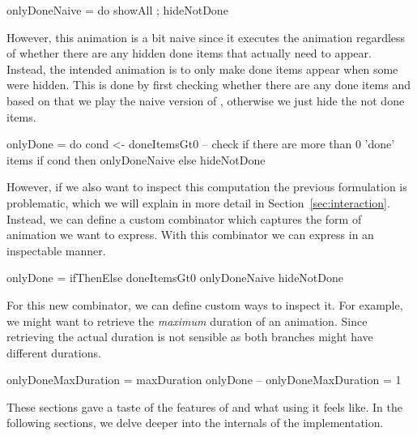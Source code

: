 \begin{spec}
onlyDoneNaive = do showAll ; hideNotDone
\end{spec}

However, this animation is a bit naive since it executes the  animation regardless of whether there are any hidden done items that actually need to appear. Instead, the intended animation is to only make done items appear when some were hidden. This is done by first checking whether there are any done items and based on that we play the naive version of , otherwise we just hide the not done items.

\begin{spec}
onlyDone = do
  cond <- doneItemsGt0 -- check if there are more than 0 'done' items
  if cond then onlyDoneNaive else hideNotDone
\end{spec}

However, if we also want to inspect this computation the previous formulation is problematic, which we will explain in more detail in Section~\ref{sec:interaction}. Instead, we can define a custom combinator  which captures the form of animation we want to express. With this combinator we can express  in an inspectable manner.

\begin{spec}
onlyDone = ifThenElse doneItemsGt0 onlyDoneNaive hideNotDone
\end{spec}

For this new combinator, we can define custom ways to inspect it. For example, we might want to retrieve the \emph{maximum} duration of an animation. Since retrieving the actual duration is not sensible as both branches might have different durations.

\begin{spec}
onlyDoneMaxDuration = maxDuration onlyDone
-- onlyDoneMaxDuration = 1
\end{spec}

These sections gave a taste of the features of \dsl{} and what using it feels like. In the following sections, we delve deeper into the internals of the implementation.
